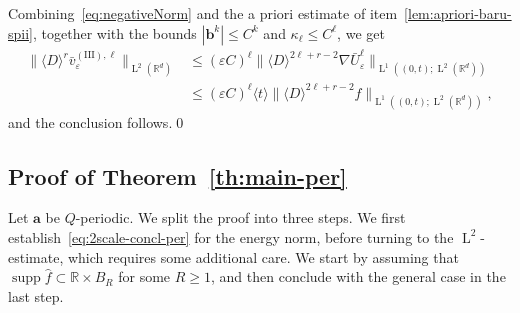 \documentclass[10pt]{amsart}
\theoremstyle{plain}
\theoremstyle{definition}
\numberwithin{equation}{section}
\newcommand{\e}{\varepsilon}
\newcommand{\R}{\mathbb R}
\newcommand{\Aa}{\boldsymbol a}
\newcommand{\bb}{{\boldsymbol b}}
\newcommand{\Ld}{\operatorname{L}}
\newcommand{\supp}{\operatorname{supp}}
\begin{document}
Combining~{\eqref{eq:negativeNorm} and the a priori estimate of item~\eqref{lem:apriori-baru-spii}}, together with the bounds $|\bb^k|\le C^k$ and $\kappa_\ell\le C^\ell$, we get
\begin{align*}
\|\langle D\rangle^r\bar v_\e^{\operatorname{(III)},\ell}\|_{\Ld^2(\R^d)}
&\le (\e C)^\ell\|\langle D\rangle^{2\ell+r-2}\nabla\bar U_\e^\ell\|_{\Ld^1((0,t);\Ld^2(\R^d))}\\
&\le (\e C)^\ell\langle t\rangle\|\langle D\rangle^{2\ell+r-2}f\|_{\Ld^1((0,t);\Ld^2(\R^d))},
\end{align*}
and the conclusion follows.\qed

\subsection{Proof of Theorem~\ref{th:main-per}}
Let $\Aa$ be $Q$-periodic.
We split the proof into three steps. We first establish~\eqref{eq:2scale-concl-per} for the energy norm, before turning to the $\Ld^2$-estimate, which requires some additional care. We start by assuming that $\supp\hat f\subset \R\times B_R$ for some $R\ge1$, and then conclude with the general case in the last step.
\end{document}
